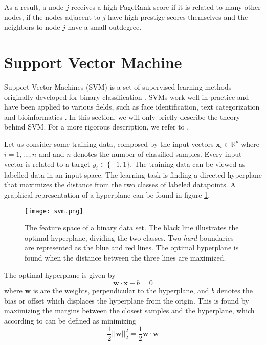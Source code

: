 As a result, a node $j$ receives a high PageRank score if it is related to many other nodes, if the nodes adjacent to $j$ have high prestige scores themselves and the neighbors to node $j$ have a small outdegree. 


\section{Support Vector Machine \label{svm}}
Support Vector Machines (SVM) is a set of supervised learning methods originally developed for binary classification \citep{Hsu2002}. SVMs work well in practice and have been applied to various fields, such as face identification, text categorization and bioinformatics \citep{campbell2011}. In this section, we will only briefly describe the theory behind SVM. For a more rigorous description, we refer to \citep{Kecman2005,Cortes1995,campbell2011}.

Let us consider some training data, composed by the input vectors $\bm{x}_i\in \mathds{R}^p$ where $i=1,...,n$ and and $n$ denotes the number of classified samples. Every input vector is related to a target $y_i \in \{-1,1\}$. The training data can be viewed as labelled data in an input space. The learning task is finding a directed hyperplane that maximizes the distance from the two classes of labeled datapoints. A graphical representation of a hyperplane can be found in figure \ref{svm}. 

\begin{figure}[h!]
    \centering
    \texttt{[image: svm.png]}
    \caption{The feature space of a binary data set. The black line illustrates the optimal hyperplane, dividing the two classes. Two \textit{hard} boundaries are represented as the blue and red lines. The optimal hyperplane is found when the distance between the three lines are maximized.}
    \label{svm}
\end{figure}

The optimal hyperplane is given by \citep{campbell2011}
\begin{equation}
    \bm{w}\cdot\bm{x}+b=0
\end{equation}
where $\bm{w}$ is are the weights, perpendicular to the hyperplane, and $b$ denotes the bias or offset which displaces the hyperplane from the origin. This is found by maximizing the margins between the closest samples and the hyperplane, which according to \citet{campbell2011} can be defined as minimizing $$\frac{1}{2}||\bm{w}||_2^2=\frac{1}{2}\bm{w}\cdot\bm{w}$$

